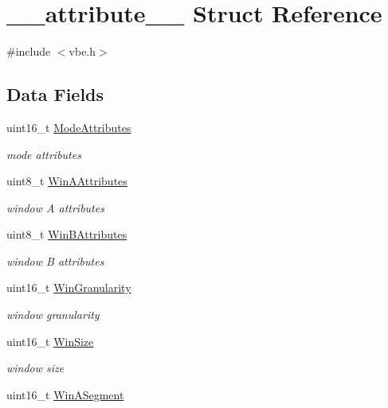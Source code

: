 \hypertarget{struct____attribute____}{}\section{\+\_\+\+\_\+attribute\+\_\+\+\_\+ Struct Reference}
\label{struct____attribute____}


{\ttfamily \#include $<$vbe.\+h$>$}

\subsection*{Data Fields}
\begin{DoxyCompactItemize}
\item 
uint16\+\_\+t \hyperlink{struct____attribute_____ad7593abf9d201ce5e59de60baba548cd}{Mode\+Attributes}
\begin{DoxyCompactList}\small\item\em mode attributes \end{DoxyCompactList}\item 
uint8\+\_\+t \hyperlink{struct____attribute_____aaa90049ea7f03763acbbf75240f4f5d8}{Win\+A\+Attributes}
\begin{DoxyCompactList}\small\item\em window A attributes \end{DoxyCompactList}\item 
uint8\+\_\+t \hyperlink{struct____attribute_____a370ddeb84e904ef1000fe57905ebf6b8}{Win\+B\+Attributes}
\begin{DoxyCompactList}\small\item\em window B attributes \end{DoxyCompactList}\item 
uint16\+\_\+t \hyperlink{struct____attribute_____a38f205f799c6929629395f03e24de077}{Win\+Granularity}
\begin{DoxyCompactList}\small\item\em window granularity \end{DoxyCompactList}\item 
uint16\+\_\+t \hyperlink{struct____attribute_____a78985f1c5ae166cb560099273cc558b4}{Win\+Size}
\begin{DoxyCompactList}\small\item\em window size \end{DoxyCompactList}\item 
uint16\+\_\+t \hyperlink{struct____attribute_____a99b747099fd4d4271b0f0bc29f31c48f}{Win\+A\+Segment}

\end{DoxyCompactItemize}
